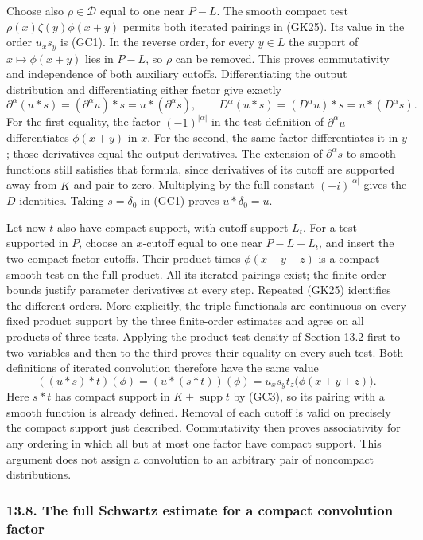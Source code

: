 \documentclass[
  11pt,
]{article}
\begin{document}
Choose also \(\rho\in\mathcal D\) equal to one near \(P-L\). The smooth
compact test \(\rho(x)\zeta(y)\phi(x+y)\) permits both iterated pairings
in (GK25). Its value in the order \(u_xs_y\) is (GC1). In the reverse
order, for every \(y\in L\) the support of \(x\mapsto\phi(x+y)\) lies in
\(P-L\), so \(\rho\) can be removed. This proves commutativity and
independence of both auxiliary cutoffs. Differentiating the output
distribution and differentiating either factor give exactly \[
 \partial^\alpha(u*s)
    =(\partial^\alpha u)*s=u*(\partial^\alpha s),\qquad
 D^\alpha(u*s)=(D^\alpha u)*s=u*(D^\alpha s).
 \tag{GC4}
\] For the first equality, the factor \((-1)^{|\alpha|}\) in the test
definition of \(\partial^\alpha u\) differentiates \(\phi(x+y)\) in
\(x\). For the second, the same factor differentiates it in \(y\); those
derivatives equal the output derivatives. The extension of
\(\partial^\alpha s\) to smooth functions still satisfies that formula,
since derivatives of its cutoff are supported away from \(K\) and pair
to zero. Multiplying by the full constant \((-i)^{|\alpha|}\) gives the
\(D\) identities. Taking \(s=\delta_0\) in (GC1) proves
\(u*\delta_0=u\).

Let now \(t\) also have compact support, with cutoff support \(L_t\).
For a test supported in \(P\), choose an \(x\)-cutoff equal to one near
\(P-L-L_t\), and insert the two compact-factor cutoffs. Their product
times \(\phi(x+y+z)\) is a compact smooth test on the full product. All
its iterated pairings exist; the finite-order bounds justify parameter
derivatives at every step. Repeated (GK25) identifies the different
orders. More explicitly, the triple functionals are continuous on every
fixed product support by the three finite-order estimates and agree on
all products of three tests. Applying the product-test density of
Section 13.2 first to two variables and then to the third proves their
equality on every such test. Both definitions of iterated convolution
therefore have the same value \[
 ((u*s)*t)(\phi)=(u*(s*t))(\phi)
       =u_xs_yt_z\bigl(\phi(x+y+z)\bigr).
 \tag{GC5}
\] Here \(s*t\) has compact support in \(K+\operatorname{supp}t\) by
(GC3), so its pairing with a smooth function is already defined. Removal
of each cutoff is valid on precisely the compact support just described.
Commutativity then proves associativity for any ordering in which all
but at most one factor have compact support. This argument does not
assign a convolution to an arbitrary pair of noncompact distributions.

\subsubsection{13.8. The full Schwartz estimate for a compact
convolution
factor}\label{the-full-schwartz-estimate-for-a-compact-convolution-factor}
\end{document}

